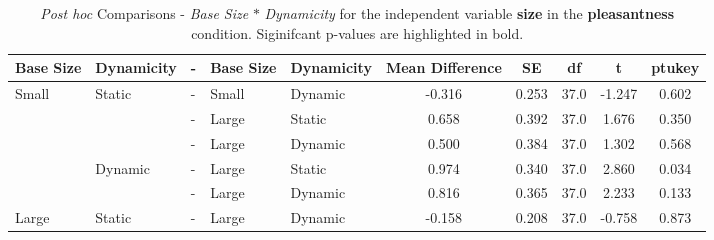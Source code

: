 \begin{table*}[ht]
    \centering
    \caption{\textit{Post hoc} Comparisons - \textit{Base Size} $\ast$ \textit{Dynamicity} for the independent variable \textbf{size} in the \textbf{pleasantness} condition. Siginifcant p-values are highlighted in bold.}
    \begin{tabular}{lllll|ccccc}
    \toprule
    \textbf{Base Size}   & \textbf{Dynamicity} & -  & \textbf{Base Size}    & \textbf{Dynamicity} & \textbf{Mean Difference} & \textbf{SE} & \textbf{df} & \textbf{t} & \textbf{ptukey} \\
    \midrule
    Small                & Static              & - & Small                  & Dynamic             & -0.316                   & 0.253       & 37.0        & -1.247    & 0.602            \\
                         &                     & - & Large                  & Static              & 0.658                    & 0.392       & 37.0        & 1.676     & 0.350            \\
                         &                     & - & Large                  & Dynamic             & 0.500                    & 0.384       & 37.0        & 1.302     & 0.568            \\
                         & Dynamic             & - & Large                  & Static              & 0.974                    & 0.340       & 37.0        & 2.860     & 0.034            \\
                         &                     & - & Large                  & Dynamic             & 0.816                    & 0.365       & 37.0        & 2.233     & 0.133            \\
    Large                & Static              & - & Large                  & Dynamic             & -0.158                   & 0.208       & 37.0        & -0.758    & 0.873            \\
    \bottomrule                           
    \end{tabular}
\end{table*}

\twocolumn
\clearpage
